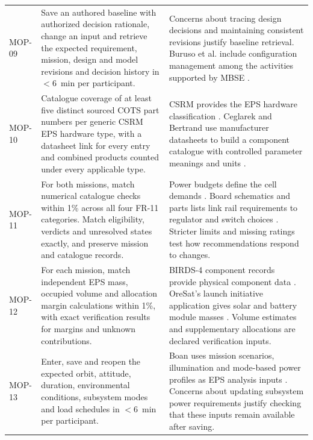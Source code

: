 \begin{longtable}{@{}P{0.13\ReportTableBodyWidth}P{0.45\ReportTableBodyWidth}P{0.42\ReportTableBodyWidth}@{}}
\addlinespace[3pt]
MOP-09 & Save an authored baseline with authorized decision rationale, change an input and retrieve the expected requirement, mission, design and model revisions and decision history in $<6$~min per participant. & Concerns about tracing design decisions and maintaining consistent revisions justify baseline retrieval. Buruso et al. include configuration management among the activities supported by MBSE \citep{buruso2026modelbased}. \\
\addlinespace[3pt]
MOP-10 & Catalogue coverage of at least five distinct sourced COTS part numbers per generic CSRM EPS hardware type, with a datasheet link for every entry and combined products counted under every applicable type. & CSRM provides the EPS hardware classification \citep{omg2025csrm,incose2025csrmmodel}. Ceglarek and Bertrand use manufacturer datasheets to build a component catalogue with controlled parameter meanings and units \citep[Sec.~3]{review-0257}. \\
\addlinespace[3pt]
MOP-11 & For both missions, match numerical catalogue checks within 1\% across all four FR-11 categories. Match eligibility, verdicts and unresolved states exactly, and preserve mission and catalogue records. & Power budgets define the cell demands \citep{shrestha2022birds4powerbudget,oresat2019powerbudget}. Board schematics and parts lists link rail requirements to regulator and switch choices \citep{birds4obchardware,oresatc3v5hardware}. Stricter limits and missing ratings test how recommendations respond to changes. \\
\addlinespace[3pt]
MOP-12 & For each mission, match independent EPS mass, occupied volume and allocation margin calculations within 1\%, with exact verification results for margins and unknown contributions. & BIRDS-4 component records provide physical component data \citep{shrestha2021birdssafety}. OreSat's launch initiative application gives solar and battery module masses \citep[Sec.~D.2]{oresat2016csli}. Volume estimates and supplementary allocations are declared verification inputs. \\
\addlinespace[3pt]
MOP-13 & Enter, save and reopen the expected orbit, attitude, duration, environmental conditions, subsystem modes and load schedules in $<6$~min per participant. & Boan uses mission scenarios, illumination and mode-based power profiles as EPS analysis inputs \citep[Sec.~2]{review-0289}. Concerns about updating subsystem power requirements justify checking that these inputs remain available after saving. \\

\end{longtable}
